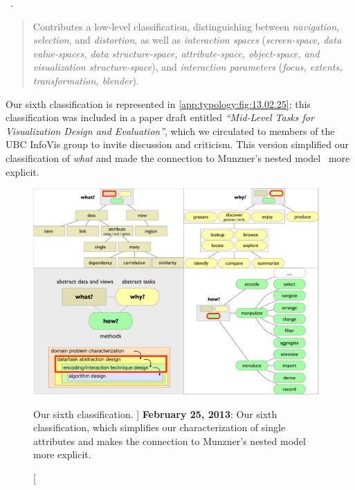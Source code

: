 \begin{sloppypar}
~\cite{Ward2004}. \end{sloppypar}

\begin{quotation}
    Contributes a low-level classification, distinguishing between {\it navigation, selection}, and {\it distortion}, as well as {\it interaction spaces} ({\it screen-space, data value-spaces, data structure-space, attribute-space, object-space, and visualization structure-space}), and {\it interaction parameters} ({\it focus, extents, transformation, blender}).
\end{quotation}

Our sixth classification is represented in \autoref{app:typology:fig:13.02.25}; this classification was included in a paper draft entitled {\it``Mid-Level Tasks for Visualization Design and Evaluation''}, which we circulated to members of the UBC InfoVis group to invite discussion and criticism.
This version simplified our classification of {\it what} and made the connection to Munzner's nested model~\cite{Munzner2009} more explicit.


\begin{figure}
	\centering
	\includegraphics[width=0.975\textwidth]{figures/typology-13-02-25.pdf}
	\caption
	[
	    Our sixth classification.
	]
	{
	    {\bf February 25, 2013}: Our sixth classification, which simplifies our characterization of single attributes and makes the connection to Munzner's nested model~\cite{Munzner2009} more explicit.
	}
	\centering
	\label{app:typology:fig:13.02.25}
\end{figure}

